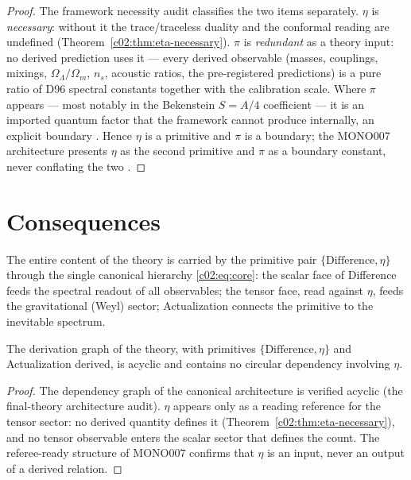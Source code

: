 \begin{proof}
The framework necessity audit \cite{c02:QG291} classifies the two items separately. $\eta$ is
\emph{necessary}: without it the trace/traceless duality and the conformal reading are
undefined (Theorem~\ref{c02:thm:eta-necessary}). $\pi$ is \emph{redundant} as a theory input: no
derived prediction uses it --- every derived observable (masses, couplings, mixings,
$\Omega_\Lambda/\Omega_m$, $n_s$, acoustic ratios, the pre-registered predictions) is a pure
ratio of D96 spectral constants together with the calibration scale. Where $\pi$ appears ---
most notably in the Bekenstein $S=A/4$ coefficient --- it is an imported quantum factor that
the framework cannot produce internally, an explicit boundary \cite{c02:QG185}. Hence $\eta$
is a primitive and $\pi$ is a boundary; the MONO007 architecture presents $\eta$ as the
second primitive and $\pi$ as a boundary constant, never conflating the two \cite{c02:MONO007}.
\end{proof}

\section{Consequences}
\label{c02:sec:eta-consequences}

The entire content of the theory is carried by the primitive pair
$\{\text{Difference},\eta\}$ through the single canonical hierarchy \eqref{c02:eq:core}: the
scalar face of Difference feeds the spectral readout of all observables; the tensor face, read
against $\eta$, feeds the gravitational (Weyl) sector; Actualization connects the primitive to
the inevitable spectrum.

\begin{theorem}
\label{c02:thm:reference-safety}
The derivation graph of the theory, with primitives $\{\text{Difference},\eta\}$ and
Actualization derived, is acyclic and contains no circular dependency involving $\eta$.
\end{theorem}

\begin{proof}
The dependency graph of the canonical architecture is verified acyclic (the final-theory
architecture audit). $\eta$ appears only as a reading reference for the tensor sector: no
derived quantity defines it (Theorem~\ref{c02:thm:eta-necessary}), and no tensor observable
enters the scalar sector that defines the count. The referee-ready structure of MONO007
\cite{c02:MONO007} confirms that $\eta$ is an input, never an output of a derived relation.
\end{proof}

